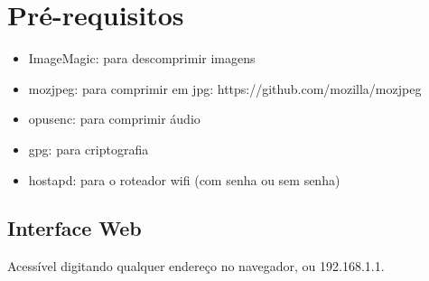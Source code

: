 \documentclass[11pt,a4paper]{article}
\begin{document}
\section{Pré-requisitos}

\begin{itemize}
\item ImageMagic: para descomprimir imagens
\item mozjpeg: para comprimir em jpg: https://github.com/mozilla/mozjpeg
\item opusenc: para comprimir áudio
\item gpg: para criptografia
\item hostapd: para o roteador wifi (com senha ou sem senha)
\end{itemize}

\subsection{Interface Web}

Acessível digitando qualquer endereço no navegador, ou 192.168.1.1.
\end{document}

